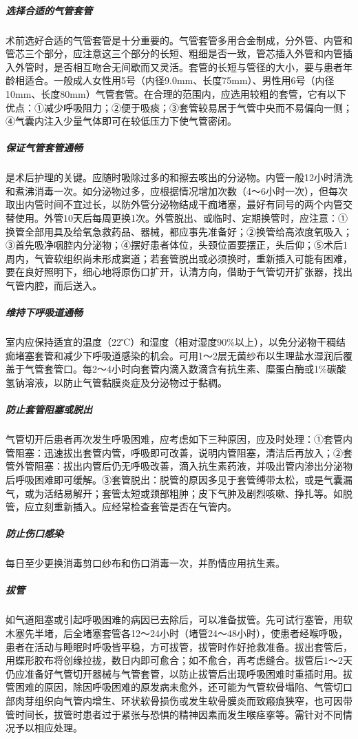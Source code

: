 \subparagraph{选择合适的气管套管}

术前选好合适的气管套管是十分重要的。气管套管多用合金制成，分外管、内管和管芯三个部分，应注意这三个部分的长短、粗细是否一致，管芯插入外管和内管插入外管时，是否相互吻合无间歇而又灵活。套管的长短与管径的大小，要与患者年龄相适合。一般成人女性用5号（内径9.0mm、长度75mm）、男性用6号（内径10mm、长度80mm）气管套管。在合理的范围内，应选用较粗的套管，它有以下优点：①减少呼吸阻力；②便于吸痰；③套管较易居于气管中央而不易偏向一侧；④气囊内注入少量气体即可在较低压力下使气管密闭。

\subparagraph{保证气管套管通畅}

是术后护理的关键。应随时吸除过多的和擦去咳出的分泌物。内管一般12小时清洗和煮沸消毒一次。如分泌物过多，应根据情况增加次数（4～6小时一次），但每次取出内管时间不宜过长，以防外管分泌物结成干痂堵塞，最好有同号的两个内管交替使用。外管10天后每周更换1次。外管脱出、或临时、定期换管时，应注意：①换管全部用具及给氧急救药品、器械，都应事先准备好；②换管给高浓度氧吸入；③首先吸净咽腔内分泌物；④摆好患者体位，头颈位置要摆正，头后仰；⑤术后1周内，气管软组织尚未形成窦道；若套管脱出或必须换时，重新插入可能有困难，要在良好照明下，细心地将原伤口扩开，认清方向，借助于气管切开扩张器，找出气管内腔，而后送入。

\subparagraph{维持下呼吸道通畅}

室内应保持适宜的温度（22℃）和湿度（相对湿度90\%以上），以免分泌物干稠结痂堵塞套管和减少下呼吸道感染的机会。可用1～2层无菌纱布以生理盐水湿润后覆盖于气管套管口。每2～4小时向套管内滴入数滴含有抗生素、糜蛋白酶或1\%碳酸氢钠溶液，以防止气管黏膜炎症及分泌物过于黏稠。

\subparagraph{防止套管阻塞或脱出}

气管切开后患者再次发生呼吸困难，应考虑如下三种原因，应及时处理：①套管内管阻塞：迅速拔出套管内管，呼吸即可改善，说明内管阻塞，清洁后再放入；②套管外管阻塞：拔出内管后仍无呼吸改善，滴入抗生素药液，并吸出管内渗出分泌物后呼吸困难即可缓解。③套管脱出：脱管的原因多见于套管缚带太松，或是气囊漏气，或为活结易解开；套管太短或颈部粗肿；皮下气肿及剧烈咳嗽、挣扎等。如脱管，应立刻重新插入。应经常检查套管是否在气管内。

\subparagraph{防止伤口感染}

每日至少更换消毒剪口纱布和伤口消毒一次，并酌情应用抗生素。

\subparagraph{拔管}

如气道阻塞或引起呼吸困难的病因已去除后，可以准备拔管。先可试行塞管，用软木塞先半堵，后全堵塞套管各12～24小时（堵管24～48小时），使患者经喉呼吸，患者在活动与睡眠时呼吸皆平稳，方可拔管，拔管时作好抢救准备。拔出套管后，用蝶形胶布将创缘拉拢，数日内即可愈合；如不愈合，再考虑缝合。拔管后1～2天仍应准备好气管切开器械与气管套管，以防止拔管后出现呼吸困难时重插时用。拔管困难的原因，除因呼吸困难的原发病未愈外，还可能为气管软骨塌陷、气管切口部肉芽组织向气管内增生、环状软骨损伤或发生软骨膜炎而致瘢痕狭窄，也可因带管时间长，拔管时患者过于紧张与恐惧的精神因素而发生喉痉挛等。需针对不同情况予以相应处理。


